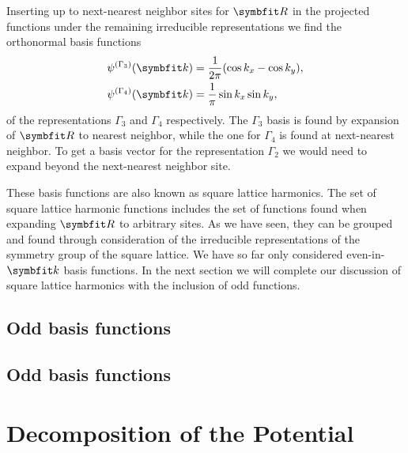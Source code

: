 Inserting up to next-nearest neighbor sites for $\v{R}$ in the projected functions under the remaining irreducible representations we find the orthonormal basis 
functions
\begin{subequations}
    \label{eq:Group:SLH:even:bases}
    \begin{align}
        \label{eq:Group:SLH:even:bases:G3}
        \psi^{(\Gamma_3)}(\v{k}) &= \frac{1}{2\pi}(\cos k_x - \cos k_y),\\
        \label{eq:Group:SLH:even:bases:G4}
        \psi^{(\Gamma_4)}(\v{k}) &= \frac{1}{\pi}\sin k_x\sin k_y,
    \end{align}
\end{subequations}
of the representations $\Gamma_3$ and $\Gamma_4$ respectively. The $\Gamma_3$ basis is found by expansion of $\v{R}$ to nearest neighbor, while the one for $\Gamma_4$
is found at next-nearest neighbor. To get a basis vector for the representation $\Gamma_2$ we would need to expand beyond the next-nearest neighbor site.

These basis functions are also known as square lattice harmonics. The set of square lattice harmonic functions includes the set of functions found when expanding
$\v{R}$ to arbitrary sites. As we have seen, they can be grouped and found through consideration of the irreducible representations of the symmetry group of the
square lattice. We have so far only considered even-in-$\v{k}$ basis functions. In the next section we will complete our discussion of square lattice harmonics
with the inclusion of odd functions.

\subsection{Odd basis functions}



\subsection{Odd basis functions}

\section{Decomposition of the Potential}

